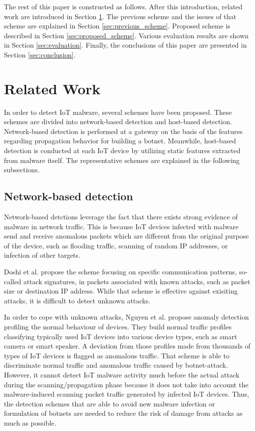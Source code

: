 \documentclass{ieeeaccess}
\begin{document}
The rest of this paper is constructed as follows. 
After this introduction, related work are introduced in Section \ref{sec:related_work}.
The previous scheme and the issues of that scheme are explained in Section \ref{sec:previous_scheme}.
Proposed scheme is described in Section \ref{sec:proposed_scheme}.
Various evaluation results are shown in Section \ref{sec:evaluation}.
Finally, the conclusions of this paper are presented in Section \ref{sec:conclusion}.


\section{Related Work} \label{sec:related_work}
In order to detect IoT malware, several schemes have been proposed.
These schemes are divided into network-based detection and host-based detection.
Network-based detection is performed at a gateway on the basis of the features regarding propagation behavior for building a botnet.
Meanwhile, host-based detection is conducted at each IoT device by utilizing static features extracted from malware itself.
The representative schemes are explained in the following subsections.

\subsection{Network-based detection}
Network-based detctions \cite{zako, diot, net} leverage the fact that there exists strong evidence of malware in network traffic.
This is because IoT devices infected with malware send and receive anomalous packets which are different from the original purpose of the device, such as flooding traffic, scanning of random IP addresses, or infection of other targets.

Doshi et al. \cite{zako} propose the scheme focusing on specific communication patterns, so-called attack signatures, in packets associated with known attacks, such as packet size or destination IP address.
While that scheme is effective against exisiting attacks, it is difficult to detect unknown attacks.

In order to cope with unknown attacks, Nguyen et al. \cite{diot} propose anomaly detection profiling the normal behaviour of devices.
They build normal traffic profiles classifying typically used IoT devices into various device types, such as smart camera or smart speaker.
A deviation from those profiles made from thousands of types of IoT devices is flagged as anomalous traffic.
That scheme is able to discriminate normal traffic and anomalous traffic caused by botnet-attack.
However, it cannot detect IoT malware activity much before the actual attack during the scanning/propagation phase because it does not take into account the malware-induced scanning packet traffic generated by infected IoT devices.
Thus, the detection schemes that are able to avoid new malware infection or formulation of botnets are needed to reduce the risk of damage from attacks as much as possible.
\end{document}
